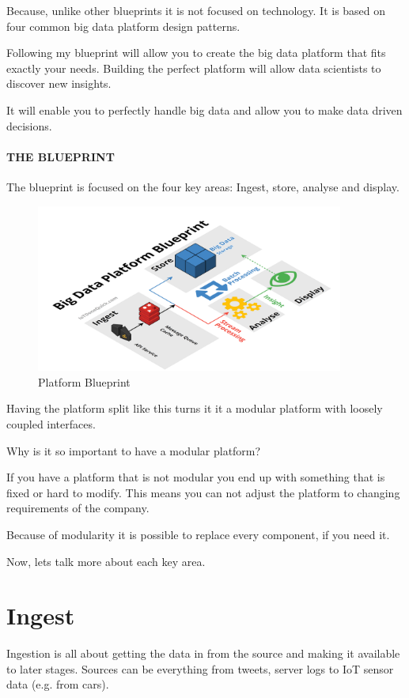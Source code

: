 \documentclass[12pt, numbers=noenddot]{scrreprt} %
\begin{document}
Because, unlike other blueprints it is not focused on technology. It is based on four common big data platform design patterns.

Following my blueprint will allow you to create the big data platform that fits exactly your needs. Building the perfect platform will allow data scientists to discover new insights.

It will enable you to perfectly handle big data and allow you to make data driven decisions.

\paragraph{THE BLUEPRINT}
The blueprint is focused on the four key areas: Ingest, store, analyse and display.

\begin{figure}[htbp]
  \centering
     \includegraphics[width=0.9\textwidth]{images/Big-Data-Platform-Blueprint-Title-Original.png}
  \caption{Platform Blueprint}
  \label{fig:Bild1}
\end{figure}


Having the platform split like this turns it it a modular platform with loosely coupled interfaces.

Why is it so important to have a modular platform?

If you have a platform that is not modular you end up with something that is fixed or hard to modify. This means you can not adjust the platform to changing requirements of the company.

Because of modularity it is possible to replace every component, if you need it.

Now, lets talk more about each key area.

\section{Ingest}
Ingestion is all about getting the data in from the source and making it available to later stages. Sources can be everything from tweets, server logs to IoT sensor data (e.g. from cars).
\end{document}
